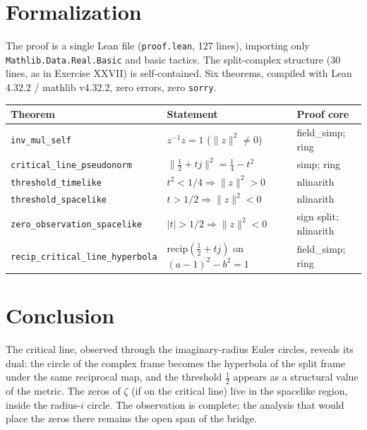 \documentclass[sigplan,10pt,anonymous,review]{acmart}
\begin{document}
\section{Formalization}

The proof is a single Lean file (\texttt{proof.lean}, 127 lines),
importing only \texttt{Mathlib.Data.Real.Basic} and basic tactics. The
split-complex structure (30 lines, as in Exercise XXVII) is
self-contained. Six theorems, compiled with Lean 4.32.2 / mathlib
v4.32.2, zero errors, zero \texttt{sorry}.

\begin{center}
\begin{tabular}{lll}
\toprule
Theorem & Statement & Proof core \\
\midrule
\texttt{inv\_mul\_self} & $z^{-1} z = 1$ ($\|z\|^2 \ne 0$) & field\_simp; ring \\
\texttt{critical\_line\_pseudonorm} & $\|\frac12 + tj\|^2 = \frac14 - t^2$ & simp; ring \\
\texttt{threshold\_timelike} & $t^2 < 1/4 \Rightarrow \|z\|^2 > 0$ & nlinarith \\
\texttt{threshold\_spacelike} & $t > 1/2 \Rightarrow \|z\|^2 < 0$ & nlinarith \\
\texttt{zero\_observation\_spacelike} & $|t| > 1/2 \Rightarrow \|z\|^2 < 0$ & sign split; nlinarith \\
\texttt{recip\_critical\_line\_hyperbola} & $\mathrm{recip}(\frac12 + tj)$ on $(a-1)^2 - b^2 = 1$ & field\_simp; ring \\
\bottomrule
\end{tabular}
\end{center}

\section{Conclusion}

The critical line, observed through the imaginary-radius Euler circles,
reveals its dual: the circle of the complex frame becomes the hyperbola
of the split frame under the same reciprocal map, and the threshold
$\frac12$ appears as a structural value of the metric. The zeros of
$\zeta$ (if on the critical line) live in the spacelike region, inside
the radius-$i$ circle. The observation is complete; the analysis that
would place the zeros there remains the open span of the bridge.



\end{document}
